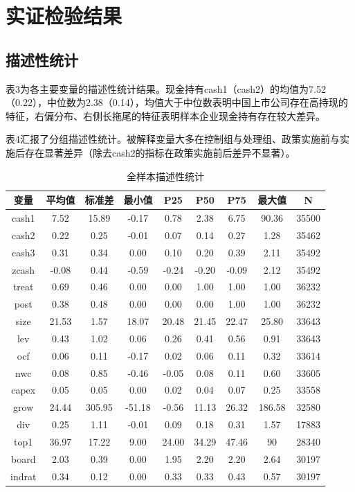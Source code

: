 \documentclass{article}
\begin{document}
\section{实证检验结果}
\subsection{描述性统计}
表3为各主要变量的描述性统计结果。现金持有cash1（cash2）的均值为7.52（0.22），中位数为2.38（0.14），均值大于中位数表明中国上市公司存在高持现的特征，右偏分布、右侧长拖尾的特征表明样本企业现金持有存在较大差异。

表4汇报了分组描述性统计。被解释变量大多在控制组与处理组、政策实施前与实施后存在显著差异（除去cash2的指标在政策实施前后差异不显著）。

\begin{table}[H]
    \centering
    \caption{全样本描述性统计}
    \begin{tabular}{ccccccccc}
    \toprule
    变量     & 平均值   & 标准差    & 最小值    & P25   & P50   & P75   & 最大值    & N     \\ \midrule
    cash1  & 7.52  & 15.89  & -0.17  & 0.78  & 2.38  & 6.75  & 90.36  & 35500 \\
    cash2  & 0.22  & 0.25   & -0.01  & 0.07  & 0.14  & 0.27  & 1.28   & 35462 \\
    cash3  & 0.31  & 0.34   & 0.00   & 0.10  & 0.20  & 0.39  & 2.11   & 35492 \\
    zcash  & -0.08 & 0.44   & -0.59  & -0.24 & -0.20 & -0.09 & 2.12   & 35492 \\
    treat  & 0.69  & 0.46   & 0.00   & 0.00  & 1.00  & 1.00  & 1.00   & 36232 \\
    post   & 0.38  & 0.48   & 0.00   & 0.00  & 0.00  & 1.00  & 1.00   & 36232 \\
    size   & 21.53 & 1.57   & 18.07  & 20.48 & 21.45 & 22.47 & 25.80  & 33643 \\
    lev    & 0.43  & 1.02   & 0.06   & 0.26  & 0.41  & 0.56  & 0.91   & 33643 \\
    ocf    & 0.06  & 0.11   & -0.17  & 0.02  & 0.06  & 0.11  & 0.32   & 33614 \\
    nwc    & 0.08  & 0.85   & -0.46  & -0.05 & 0.08  & 0.11  & 0.60   & 33605 \\
    capex  & 0.05  & 0.05   & 0.00   & 0.02  & 0.04  & 0.07  & 0.25   & 33558 \\
    grow   & 24.44 & 305.95 & -51.18 & -0.56 & 11.13 & 26.32 & 186.58 & 32580 \\
    div    & 0.25  & 1.11   & -0.01  & 0.09  & 0.18  & 0.31  & 1.57   & 17883 \\
    top1   & 36.97 & 17.22  & 9.00   & 24.00 & 34.29 & 47.46 & 90     & 28340 \\
    board  & 2.03  & 0.39   & 0.00   & 1.95  & 2.20  & 2.20  & 2.64   & 30197 \\
    indrat & 0.34  & 0.12   & 0.00   & 0.33  & 0.33  & 0.43  & 0.57   & 30197 \\ \bottomrule
    \end{tabular}
\end{table}
\end{document}
